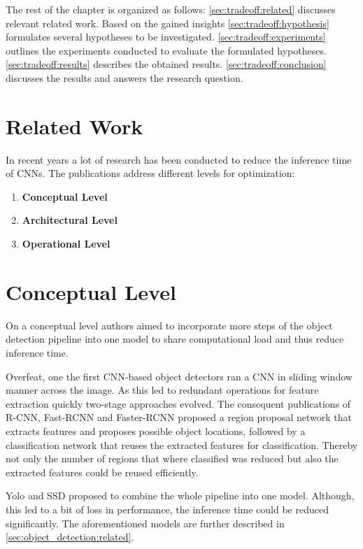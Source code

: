 The rest of the chapter is organized as follows: \autoref{sec:tradeoff:related} discusses relevant related work. Based on the gained insights \autoref{sec:tradeoff:hypothesis} formulates several hypotheses to be investigated. \autoref{sec:tradeoff:experiments} outlines the experiments conducted to evaluate the formulated hypotheses. \autoref{sec:tradeoff:results} describes the obtained results. \autoref{sec:tradeoff:conclusion} discusses the results and answers the research question.


\section{Related Work}
\label{sec:tradeoff:related_work}

In recent years a lot of research has been conducted to reduce the inference time of \acp{CNN}. The publications address different levels for optimization:
\begin{enumerate}
	\item \textbf{Conceptual Level}
	\item \textbf{Architectural Level}
	\item \textbf{Operational Level}
\end{enumerate}

\section{Conceptual Level}
 On a conceptual level authors aimed to incorporate more steps of the object detection pipeline into one model to share computational load and thus reduce inference time.
 
 Overfeat, one the first \ac{CNN}-based object detectors ran a \ac{CNN} in sliding window manner across the image. As this led to redundant operations for feature extraction quickly two-stage approaches evolved. The consequent publications of R-CNN, Fast-RCNN and Faster-RCNN proposed a region proposal network that extracts features and proposes possible object locations, followed by a classification network that reuses the extracted features for classification. Thereby not only the number of regions that where classified was reduced but also the extracted features could be reused efficiently.
 
 Yolo and SSD proposed to combine the whole pipeline into one model. Although, this led to a bit of loss in performance, the inference time could be reduced significantly. The aforementioned models are further described in \autoref{sec:object_detection:related}.
 
